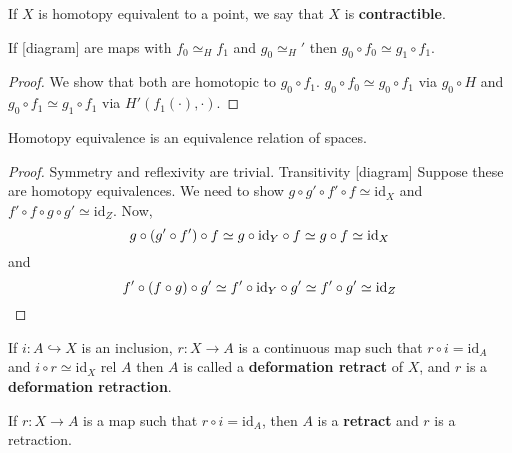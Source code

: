 \documentclass{article}
\newcommand{\id}{\mathrm{id}}
\numberwithin{nthm}{subsection}
\begin{document}
\begin{ndef}
    If $X$ is homotopy equivalent to a point, we say that $X$ is \textbf{contractible}.
\end{ndef}

\begin{nlemma}
    If
    [diagram]
    are maps with $f_0 \simeq_H f_1$ and $g_0 \simeq_H'$ then $g_0 \circ f_0 \simeq g_1 \circ f_1$.
\end{nlemma}

\begin{proof}
    We show that both are homotopic to $g_0 \circ f_1$.  $g_0 \circ f_0 \simeq g_0 \circ f_1$ via $g_0 \circ H$ and $g_0 \circ f_1 \simeq g_1 \circ f_1$ via $H'(f_1(\cdot), \cdot)$.
\end{proof}

\begin{prop}
    Homotopy equivalence is an equivalence relation of spaces.
\end{prop}

\begin{proof}
    Symmetry and reflexivity are trivial. Transitivity [diagram]
    Suppose these are homotopy equivalences. We need to show $g \circ g' \circ f' \circ f \simeq \id_X$ and $f' \circ f \circ g \circ g' \simeq \id_Z$.
    Now,
    \begin{equation*}
        g \circ (g' \circ f') \circ f \simeq g \circ \id_Y \circ f \simeq g \circ f \simeq \id_X \\
    \end{equation*}
    and
    \begin{equation*}
        f' \circ (f \circ g) \circ g' \simeq f' \circ \id_Y \circ g' \simeq f' \circ g' \simeq \id_Z \\
    \end{equation*}
\end{proof}

\begin{ndef}
    If $i: A \hookrightarrow X$ is an inclusion, $r: X \to A$ is a continuous map such that $r \circ i = \id_A$ and $i \circ r \simeq \id_X$ rel $A$ then $A$ is called a \textbf{deformation retract} of $X$, and $r$ is a \textbf{deformation retraction}.
\end{ndef}

\begin{ndef}
    If $r: X \to A$ is a map such that $ r \circ i = \id_A$, then $A$ is a \textbf{retract} and $r$ is a retraction.
\end{ndef}
\end{document}
